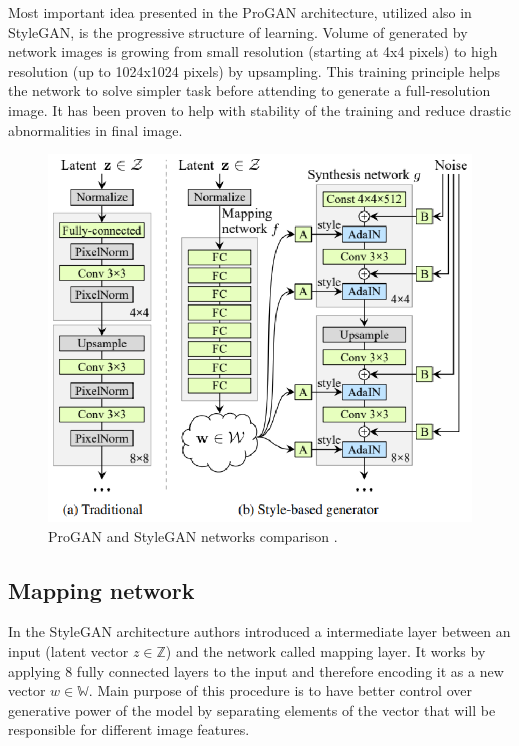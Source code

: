 \documentclass[11pt,a4paper,openany]{book}
\begin{document}
\noindent Most important idea presented in the ProGAN architecture, utilized also in StyleGAN, is the progressive structure of learning. Volume of generated by network images is growing from small resolution (starting at 4x4 pixels) to high resolution (up to 1024x1024 pixels) by upsampling. This training principle helps the network to solve simpler task before attending to generate a full-resolution image. It has been proven to help with stability of the training and reduce drastic abnormalities in final image.

\begin{figure}[ht!]
    \centering
    \includegraphics[scale=1.5]{figs/stylegan-scheme.eps}
    \caption{ProGAN and StyleGAN networks comparison \cite{stylegan}.}\label{Fig:proganistylegan}
\end{figure}

\subsection{Mapping network}

\noindent In the StyleGAN architecture authors introduced a intermediate layer between an input (latent vector $z \in \mathbb{Z}$) and the network called mapping layer. It works by applying 8 fully connected layers to the input and therefore encoding it as a new vector $w \in \mathbb{W}$. Main purpose of this procedure is to have better control over generative power of the model by separating elements of the vector that will be responsible for different image features.
\end{document}

